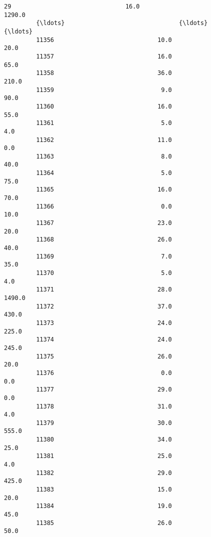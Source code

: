\documentclass[11pt]{article}
\begin{document}
\begin{Verbatim}[commandchars=\\\{\}]
         29                                16.0                              1290.0   
         {\ldots}                                {\ldots}                                 {\ldots}   
         11356                             10.0                                20.0   
         11357                             16.0                                65.0   
         11358                             36.0                               210.0   
         11359                              9.0                                90.0   
         11360                             16.0                                55.0   
         11361                              5.0                                 4.0   
         11362                             11.0                                 0.0   
         11363                              8.0                                40.0   
         11364                              5.0                                75.0   
         11365                             16.0                                70.0   
         11366                              0.0                                10.0   
         11367                             23.0                                20.0   
         11368                             26.0                                40.0   
         11369                              7.0                                35.0   
         11370                              5.0                                 4.0   
         11371                             28.0                              1490.0   
         11372                             37.0                               430.0   
         11373                             24.0                               225.0   
         11374                             24.0                               245.0   
         11375                             26.0                                20.0   
         11376                              0.0                                 0.0   
         11377                             29.0                                 0.0   
         11378                             31.0                                 4.0   
         11379                             30.0                               555.0   
         11380                             34.0                                25.0   
         11381                             25.0                                 4.0   
         11382                             29.0                               425.0   
         11383                             15.0                                20.0   
         11384                             19.0                                45.0   
         11385                             26.0                                50.0   
         

\end{Verbatim}
\end{document}

